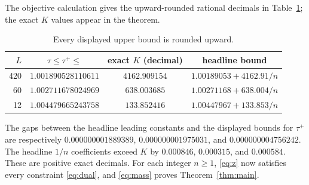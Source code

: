 \documentclass[10pt]{article}
\theoremstyle{remark}
\begin{document}
The objective calculation gives the upward-rounded rational decimals
in Table~\ref{tab:objectives}; the exact $K$ values appear in the theorem.
\begin{table}[ht]
\centering
\begin{tabular}{r|c|c|c}
$L$ & $\tau\le\tau^+\le$ & exact $K$ (decimal) & headline bound\\\hline
420 & $1.001890528110611$ & $4162.909154$ & $1.00189053+4162.91/n$\\
60 & $1.002711678024969$ & $638.003685$ & $1.00271168+638.004/n$\\
12 & $1.004479665243758$ & $133.852416$ & $1.00447967+133.853/n$
\end{tabular}
\caption{Every displayed upper bound is rounded upward.}\label{tab:objectives}
\end{table}
The gaps between the headline leading constants and the displayed
bounds for $\tau^+$ are respectively
$0.000000001889389$, $0.000000001975031$, and $0.000000004756242$.
The headline $1/n$ coefficients exceed $K$ by $0.000846$, $0.000315$,
and $0.000584$. These are positive exact decimals. For each integer
$n\ge1$, \eqref{eq:z} now satisfies every constraint \eqref{eq:dual},
and \eqref{eq:mass} proves Theorem~\ref{thm:main}.
\end{document}
